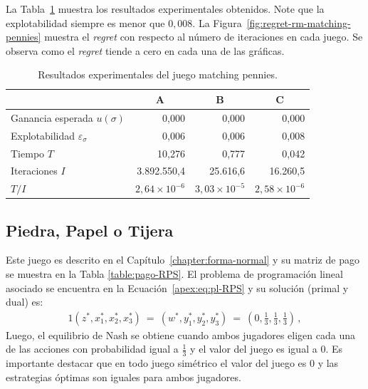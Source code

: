 La Tabla~\ref{table:resultados-rm-matching-pennies} muestra los resultados experimentales obtenidos. Note que la explotabilidad siempre es menor que $0,008$. La Figura~\ref{fig:regret-rm-matching-pennies} muestra el \textit{regret} con respecto al número de iteraciones en cada juego. Se observa como el \textit{regret} tiende a cero en cada una de las gráficas.
 
\begin{table}[t]
\caption{Resultados experimentales del juego matching pennies.}
\label{table:resultados-rm-matching-pennies}
\centering
\begin{tabular}{l r r r}
    \toprule
    & \multicolumn{1}{c}{A} & \multicolumn{1}{c}{B} & \multicolumn{1}{c}{C} \\ \midrule
    Ganancia esperada $u(\sigma)$             &     0,000 &      0,000 &      0,000 \\
    Explotabilidad $\varepsilon_{\sigma}$     &         0,006 &      0,006 &      0,008 \\
    Tiempo $T$                                &        10,276 &      0,777 &      0,042 \\
    Iteraciones $I$                           & 3.892.550,4   & 25.616,6   & 16.260,5   \\
    $T/I$                                     & $2,64{\times}10^{-6}$ & $3,03{\times}10^{-5}$ & $2,58{\times}10^{-6}$ \\
    \bottomrule
\end{tabular}
\end{table}

\subsection*{Piedra, Papel o Tijera}

Este juego es descrito en el Capítulo~\ref{chapter:forma-normal} y su matriz de pago se muestra en la Tabla \ref{table:pago-RPS}. El problema de programación lineal asociado se encuentra en la Ecuación~\ref{apex:eq:pl-RPS} y su solución (primal y dual) es:
\begin{alignat}{1}
(z^*, x_1^*, x_2^*, x_3^*)\ =\ (w^*, y_1^*, y_2^*, y_3^*)\ =\  \left(0, \frac{1}{3}, \frac{1}{3}, \frac{1}{3}\right) \,,
\end{alignat}
Luego, el equilibrio de Nash se obtiene cuando ambos jugadores eligen cada una de las acciones con probabilidad igual a $\frac{1}{3}$ y el valor del juego es igual a $0$. Es importante destacar que en todo juego simétrico el valor del juego es $0$ y las estrategias óptimas son iguales para ambos jugadores.

